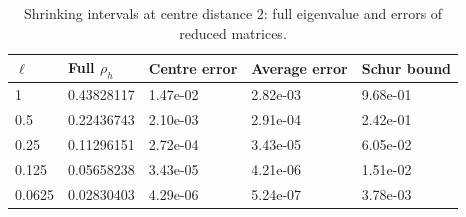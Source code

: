 \begin{table}[htbp]
\centering
\caption{Shrinking intervals at centre distance $2$: full eigenvalue and errors of reduced matrices.}
\label{tab:fragmentation}
\begin{tabular}{lllll}
\toprule
$\ell$ & Full $\rho_h$ & Centre error & Average error & Schur bound \\
\midrule
1 & 0.43828117 & 1.47e-02 & 2.82e-03 & 9.68e-01 \\
0.5 & 0.22436743 & 2.10e-03 & 2.91e-04 & 2.42e-01 \\
0.25 & 0.11296151 & 2.72e-04 & 3.43e-05 & 6.05e-02 \\
0.125 & 0.05658238 & 3.43e-05 & 4.21e-06 & 1.51e-02 \\
0.0625 & 0.02830403 & 4.29e-06 & 5.24e-07 & 3.78e-03 \\
\bottomrule
\end{tabular}
\end{table}
